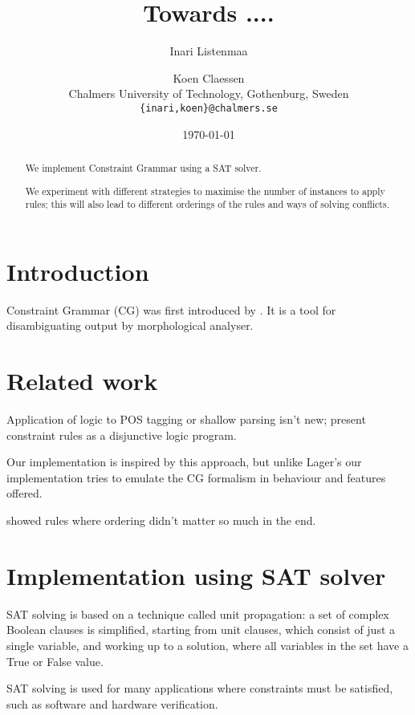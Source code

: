 \documentclass[11pt]{article}
\title{Towards ....}
\author{Inari Listenmaa \and Koen Claessen \\
  Chalmers University of Technology, Gothenburg, Sweden \\
  {\tt \{inari,koen\}@chalmers.se} }
\date{\today}
\begin{document}
\maketitle
\begin{abstract}
We implement Constraint Grammar using a SAT solver.

We experiment with different strategies to maximise the number of instances to apply rules;
this will also lead to different orderings of the rules and ways of solving conflicts.


\end{abstract}


\section{Introduction}
Constraint Grammar (CG) was first introduced by \cite{karlsson1995constraint}. 
It is a tool for disambiguating output by morphological analyser.


\section{Related work}
\label{sect:related}

Application of logic to POS tagging or shallow parsing isn't new;
\cite{lager98, lager_nivre01} present constraint rules as 
a disjunctive logic program.

Our implementation is inspired by this approach,
but unlike Lager's our implementation tries to emulate the CG
formalism in behaviour and features offered.

\cite{lager01transformation} showed rules where ordering didn't matter so much in the end.



\section{Implementation using SAT solver}
\label{sect:pdf}

SAT solving is based on a technique called unit propagation:
a set of complex Boolean clauses is simplified, starting from unit
clauses, which consist of just a single variable, and working up to a
solution, where all variables in the set have a True or False value.

SAT solving is used for many applications where constraints must be
satisfied, such as software and hardware verification.
\end{document}
